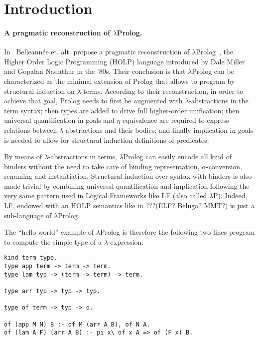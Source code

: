 \documentclass{easychair}
\begin{document}
\section{Introduction}

\paragraph{A pragmatic reconstruction of $\lambda$Prolog.}

In~\cite{jlp98} Belleannée et. alt. propose a pragmatic reconstruction
of $\lambda$Prolog~\cite{lambdap1,lambdap2,lambdap3}, the Higher Order
Logic Programming (HOLP) language introduced by Dale Miller and
Gopalan Nadathur in the '80s.
Their conclusion is that $\lambda$Prolog can be characterized as the
minimal extension of Prolog that allows to program by structural
induction on $\lambda$-terms. According to their reconstruction, in
order to achieve that goal, Prolog needs to first be augmented with
$\lambda$-abstractions in the term syntax; then types are added to
drive full higher-order unification; then universal quantification in
goals and $\eta$-equivalence are required to express relations between
$\lambda$-abstractions and their bodies; and finally implication in
goals is needed to allow for structural induction definitions of
predicates.

By means of $\lambda$-abstractions in terms, $\lambda$Prolog can
easily encode all kind of binders without the need to take care of
binding representation, $\alpha$-conversion, renaming and
instantiation. Structural induction over syntax with binders is also
made trivial by combining universal quantification and implication
following the very same pattern used in Logical Frameworks like LF
(also called $\lambda$P). Indeed, LF, endowed with an HOLP semantics
like in ???(ELF? Beluga? MMT?) is just a sub-language of
$\lambda$Prolog.

The ``hello world'' example of $\lambda$Prolog is therefore the
following two lines program to compute the simple type of a
$\lambda$-expression:

\begin{verbatim}
kind term type.
type app term -> term -> term.
type lam typ -> (term -> term) -> term.

type arr typ -> typ -> typ.

type of term -> typ -> o.

of (app M N) B :- of M (arr A B), of N A.
of (lam A F) (arr A B) :- pi x\ of x A => of (F x) B.
\end{verbatim}
\end{document}
